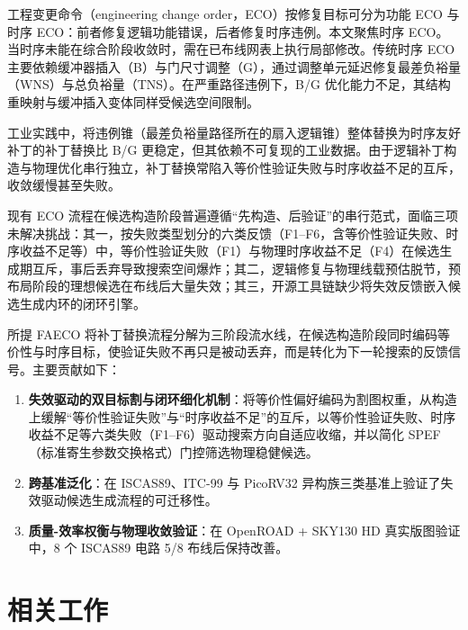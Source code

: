 \documentclass[twocolumn,10pt]{ctexart}
\begin{document}
工程变更命令（engineering change order，ECO）按修复目标可分为功能 ECO 与时序 ECO：前者修复逻辑功能错误，后者修复时序违例。本文聚焦时序 ECO。当时序未能在综合阶段收敛时，需在已布线网表上执行局部修改。传统时序 ECO 主要依赖缓冲器插入（B）与门尺寸调整（G），通过调整单元延迟修复最差负裕量（WNS）与总负裕量（TNS）。在严重路径违例下，B/G 优化能力不足，其结构重映射与缓冲插入变体同样受候选空间限制\cite{chen2012metal,chen2012fixability,liang2012buffer,ho2010eco}。

工业实践中，将违例锥（最差负裕量路径所在的扇入逻辑锥）整体替换为时序友好补丁的补丁替换比 B/G 更稳定，但其依赖不可复现的工业数据。由于逻辑补丁构造与物理优化串行独立，补丁替换常陷入等价性验证失败与时序收益不足的互斥，收敛缓慢甚至失败。

现有 ECO 流程在候选构造阶段普遍遵循“先构造、后验证”的串行范式，面临三项未解决挑战：其一，按失败类型划分的六类反馈（F1--F6，含等价性验证失败、时序收益不足等）中，等价性验证失败（F1）与物理时序收益不足（F4）在候选生成期互斥，事后丢弃导致搜索空间爆炸；其二，逻辑修复与物理线载预估脱节，预布局阶段的理想候选在布线后大量失效；其三，开源工具链缺少将失效反馈嵌入候选生成内环的闭环引擎。

所提 FAECO 将补丁替换流程分解为三阶段流水线，在候选构造阶段同时编码等价性与时序目标，使验证失败不再只是被动丢弃，而是转化为下一轮搜索的反馈信号。主要贡献如下：

\begin{enumerate}
  \item \textbf{失效驱动的双目标割与闭环细化机制}：将等价性偏好编码为割图权重，从构造上缓解“等价性验证失败”与“时序收益不足”的互斥，以等价性验证失败、时序收益不足等六类失败（F1--F6）驱动搜索方向自适应收缩，并以简化 SPEF（标准寄生参数交换格式）门控筛选物理稳健候选。
\item \textbf{跨基准泛化}：在 ISCAS89\cite{iscas89}、ITC-99\cite{itc99} 与 PicoRV32\cite{picorv32} 异构族三类基准上验证了失效驱动候选生成流程的可迁移性。
\item \textbf{质量-效率权衡与物理收敛验证}：在 OpenROAD\cite{openroad} + SKY130 HD\cite{sky130} 真实版图验证中，8 个 ISCAS89 电路 5/8 布线后保持改善。
\end{enumerate}

\section{相关工作}
\end{document}
